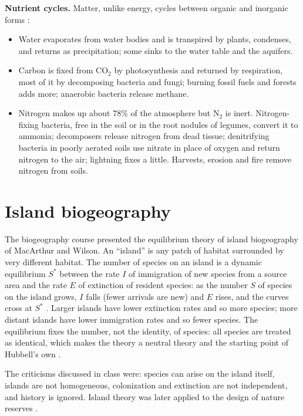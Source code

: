 \textbf{Nutrient cycles.}
Matter, unlike energy, cycles between
organic and inorganic forms
\cite[Chapter 25]{stern2008plant}:
\begin{itemize}
\item Water evaporates from water bodies and
is transpired by plants, condenses, and
returns as precipitation; some sinks to the
water table and the aquifers.
\item Carbon is fixed from $\mathrm{CO_2}$ by
photosynthesis and returned by respiration,
most of it by decomposing bacteria and
fungi; burning fossil fuels and forests
adds more; anaerobic bacteria release
methane.
\item Nitrogen makes up about 78\% of the
atmosphere but $\mathrm{N_2}$ is inert.
Nitrogen-fixing bacteria, free in the soil
or in the root nodules of legumes, convert
it to ammonia; decomposers release nitrogen
from dead tissue; denitrifying bacteria in
poorly aerated soils use nitrate in place of
oxygen and return nitrogen to the air;
lightning fixes a little. Harvests, erosion
and fire remove nitrogen from soils.
\end{itemize}

\section{Island biogeography}
\label{section-island-biogeography}

The biogeography course presented the
equilibrium theory of island biogeography
of MacArthur and Wilson. An ``island'' is any
patch of habitat surrounded by very
different habitat. The number of species on
an island is a dynamic equilibrium $S^*$
between the rate $I$ of immigration of new
species from a source area and the rate $E$
of extinction of resident species: as the
number $S$ of species on the island grows,
$I$ falls (fewer arrivals are new) and $E$
rises, and the curves cross at $S^*$
\cite[Chapter 1]{hubbell2001unified}. Larger
islands have lower extinction rates and so
more species; more distant islands have
lower immigration rates and so fewer
species. The equilibrium fixes the number,
not the identity, of species: all species
are treated as identical, which makes the
theory a neutral theory and the starting
point of Hubbell's own
\cite[Chapter 1]{hubbell2001unified}.

The criticisms
discussed in class were: species can arise on the
island itself, islands are not homogeneous,
colonization and extinction are not
independent, and history is ignored. Island
theory was later applied to the design of
nature reserves
\cite[Chapter 1]{hubbell2001unified}.

